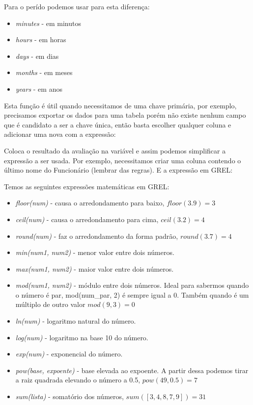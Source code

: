 \documentclass[a4paper,11pt]{article}
\begin{document}
Para o perído podemos usar para esta diferença:
\begin{itemize}[nolistsep]
	\item \textit{minutes} - em minutos
	\item \textit{hours} - em horas
	\item \textit{days} - em dias
	\item \textit{months} - em meses
	\item \textit{years} - em anos
\end{itemize}


Esta função é útil quando necessitamos de uma chave primária, por exemplo, precisamos exportar os dados para uma tabela porém não existe nenhum campo que é candidato a ser a chave única, então basta escolher qualquer coluna e adicionar uma nova com a expressão: \\


Coloca o resultado da avaliação na variável e assim podemos simplificar a expressão a ser usada. Por exemplo, necessitamos criar uma coluna contendo o último nome do Funcionário (lembrar das regras). E a expressão em GREL: \\

Temos as seguintes expressões matemáticas em GREL:
\begin{itemize}[nolistsep]
	\item \textit{floor(num)} - causa o arredondamento para baixo, $floor(3.9) = 3$
	\item \textit{ceil(num)} - causa o arredondamento para cima, $ceil(3.2) = 4$
	\item \textit{round(num)} - faz o arredondamento da forma padrão, $round(3.7) = 4$
	\item \textit{min(num1, num2)} - menor valor entre dois números.
	\item \textit{max(num1, num2)} - maior valor entre dois números.
	\item \textit{mod(num1, num2)} - módulo entre dois números. Ideal para sabermos quando o número é par, mod(num\_par, 2) é sempre igual a 0. Também quando é um múltiplo de outro valor $mod(9, 3) = 0$
	\item \textit{ln(num)} - logaritmo natural do número.
	\item \textit{log(num)} - logaritmo na base 10 do número.
	\item \textit{exp(num)} - exponencial do número.
	\item \textit{pow(base, expoente)} - base elevada ao expoente. A partir dessa podemos tirar a raiz quadrada elevando o número a 0.5, $pow(49, 0.5) = 7$
	\item \textit{sum(lista)} - somatório dos números, $sum([3, 4, 8, 7, 9]) = 31$
\end{itemize}
\end{document}
